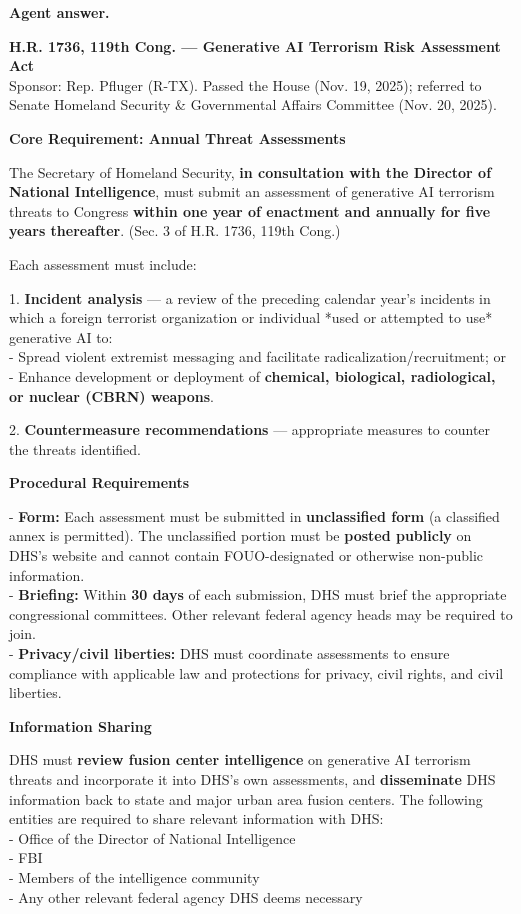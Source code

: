 \documentclass[11pt]{article}
\newcommand{\fieldlabel}[1]{\textbf{\color{navy}#1}\quad}
\begin{document}
\fieldlabel{Agent answer.}\par
\textbf{H.R. 1736, 119th Cong. --- Generative AI Terrorism Risk Assessment Act} \\
Sponsor: Rep. Pfluger (R-TX). Passed the House (Nov. 19, 2025); referred to Senate Homeland Security \& Governmental Affairs Committee (Nov. 20, 2025).

\textbf{Core Requirement: Annual Threat Assessments}

The Secretary of Homeland Security, \textbf{in consultation with the Director of National Intelligence}, must submit an assessment of generative AI terrorism threats to Congress \textbf{within one year of enactment and annually for five years thereafter}. (Sec. 3 of H.R. 1736, 119th Cong.)

Each assessment must include:

1. \textbf{Incident analysis} --- a review of the preceding calendar year's incidents in which a foreign terrorist organization or individual *used or attempted to use* generative AI to: \\
   - Spread violent extremist messaging and facilitate radicalization/recruitment; or \\
   - Enhance development or deployment of \textbf{chemical, biological, radiological, or nuclear (CBRN) weapons}.

2. \textbf{Countermeasure recommendations} --- appropriate measures to counter the threats identified.

\textbf{Procedural Requirements}

- \textbf{Form:} Each assessment must be submitted in \textbf{unclassified form} (a classified annex is permitted). The unclassified portion must be \textbf{posted publicly} on DHS's website and cannot contain FOUO-designated or otherwise non-public information. \\
- \textbf{Briefing:} Within \textbf{30 days} of each submission, DHS must brief the appropriate congressional committees. Other relevant federal agency heads may be required to join. \\
- \textbf{Privacy/civil liberties:} DHS must coordinate assessments to ensure compliance with applicable law and protections for privacy, civil rights, and civil liberties.

\textbf{Information Sharing}

DHS must \textbf{review fusion center intelligence} on generative AI terrorism threats and incorporate it into DHS's own assessments, and \textbf{disseminate} DHS information back to state and major urban area fusion centers. The following entities are required to share relevant information with DHS: \\
- Office of the Director of National Intelligence \\
- FBI \\
- Members of the intelligence community \\
- Any other relevant federal agency DHS deems necessary
\end{document}

